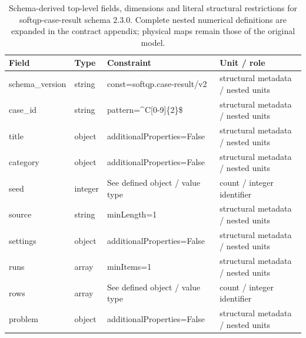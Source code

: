 \begin{table}[htbp]\centering\footnotesize
\caption{Schema-derived top-level fields, dimensions and literal structural restrictions for softqp-case-result schema 2.3.0. Complete nested numerical definitions are expanded in the contract appendix; physical maps remain those of the original model.}\label{tab:contract-softqp-case-result}
\begin{tabularx}{\textwidth}{@{}>{\raggedright\arraybackslash}p{}>{\raggedright\arraybackslash}p{}>{\raggedright\arraybackslash}X>{\raggedright\arraybackslash}X@{}}\toprule
Field & Type & Constraint & Unit / role\\\midrule
schema\_\allowbreak{}version & string & const=\allowbreak{}softqp.\allowbreak{}case-\allowbreak{}result/\allowbreak{}v2 & structural metadata /\allowbreak{} nested units\\
case\_\allowbreak{}id & string & pattern=\allowbreak{}\textasciicircum{}C[0-9]\{2\}\$ & structural metadata /\allowbreak{} nested units\\
title & object & additionalProperties=\allowbreak{}False & structural metadata /\allowbreak{} nested units\\
category & object & additionalProperties=\allowbreak{}False & structural metadata /\allowbreak{} nested units\\
seed & integer & See defined object /\allowbreak{} value type & count /\allowbreak{} integer identifier\\
source & string & minLength=\allowbreak{}1 & structural metadata /\allowbreak{} nested units\\
settings & object & additionalProperties=\allowbreak{}False & structural metadata /\allowbreak{} nested units\\
runs & array & minItems=\allowbreak{}1 & structural metadata /\allowbreak{} nested units\\
rows & array & See defined object /\allowbreak{} value type & count /\allowbreak{} integer identifier\\
problem & object & additionalProperties=\allowbreak{}False & structural metadata /\allowbreak{} nested units\\
\bottomrule\end{tabularx}
\end{table}
